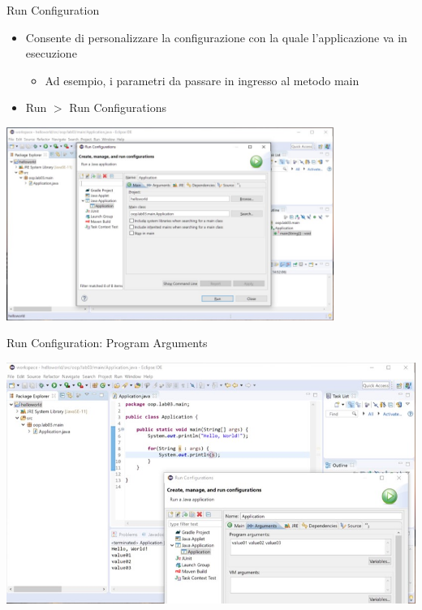 \documentclass[xcolor=dvipsnames,presentation]{beamer}
\begin{document}
\begin{frame}{Run Configuration}
\begin{itemize}
\item Consente di personalizzare la configurazione con la quale l'applicazione va in esecuzione
\begin{itemize}
\item Ad esempio, i parametri da passare in ingresso al metodo main
\end{itemize}
\item Run $>$ Run Configurations
\end{itemize}
\begin{center}
\includegraphics[width=0.8\textwidth]{img/eclipse-screenshots/eclipse-ide-04d.jpg}
\end{center}
\end{frame}

\begin{frame}{Run Configuration: Program Arguments}
\begin{center}
\includegraphics[width=\textwidth]{img/eclipse-screenshots/eclipse-ide-04e.jpg}
\end{center}
\end{frame}
\end{document}

